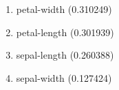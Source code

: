 \begin{enumerate}
\item petal-width (0.310249)
\item petal-length (0.301939)
\item sepal-length (0.260388)
\item sepal-width (0.127424)
\end{enumerate}